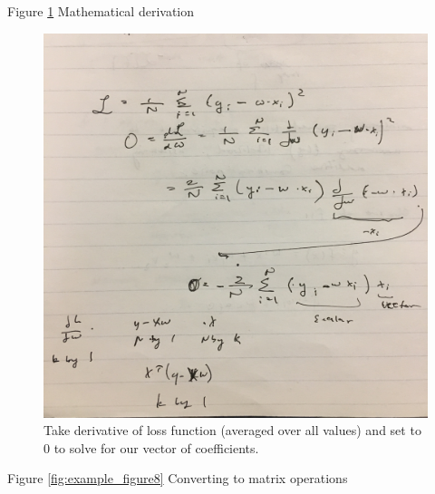Figure \ref{fig:example_figure7} Mathematical derivation
\begin{figure}[ht]
  \begin{center}
    \includegraphics[width=.9\textwidth]{figures/FullSizeRender_2.jpg}
    \caption{
      Take derivative of loss function (averaged over all values) and set to 0 to solve for our
      vector of coefficients.}
    \label{fig:example_figure7}
  \end{center}
\end{figure}

\pagebreak

Figure \ref{fig:example_figure8} Converting to matrix operations

